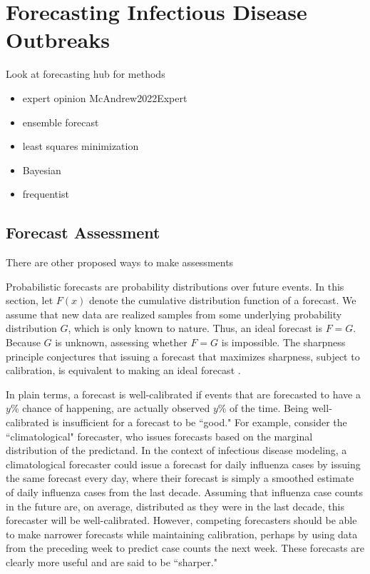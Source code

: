 \section{Forecasting Infectious Disease Outbreaks}
\label{sec:forecasting_techniques_and_assessment}

Look at forecasting hub for methods
\begin{itemize}
    \item expert opinion {McAndrew2022Expert}
    \item ensemble forecast
    \item least squares minimization
    \item Bayesian
    \item frequentist
\end{itemize}


\subsection{Forecast Assessment}

There are other proposed ways to make assessments

\citet{Cramer2022Evaluation}

\citet{Bracher2021Evaluating}

Probabilistic forecasts are probability distributions over future events.
In this section, let \( F(x) \) denote the cumulative distribution function of a forecast.
We assume that new data are realized samples from some underlying probability distribution \( G \), which is only known to nature.
Thus, an ideal forecast is \( F = G \).
Because \( G \) is unknown, assessing whether \(F = G\) is impossible.
The sharpness principle conjectures that issuing a forecast that maximizes sharpness, subject to calibration, is equivalent to making an ideal forecast \citep{Gneiting2007Probabilistic}.

In plain terms, a forecast is well-calibrated if events that are forecasted to have a \( y \)\% chance of happening, are actually observed \( y \)\% of the time.
Being well-calibrated is insufficient for a forecast to be ``good."
For example, consider the ``climatological" forecaster, who issues forecasts based on the marginal distribution of the predictand.
In the context of infectious disease modeling, a climatological forecaster could issue a forecast for daily influenza cases by issuing the same forecast every day, where their forecast is simply a smoothed estimate of daily influenza cases from the last decade.
Assuming that influenza case counts in the future are, on average, distributed as they were in the last decade, this forecaster will be well-calibrated.
However, competing forecasters should be able to make narrower forecasts while maintaining calibration, perhaps by using data from the preceding week to predict case counts the next week.
These forecasts are clearly more useful and are said to be ``sharper."

